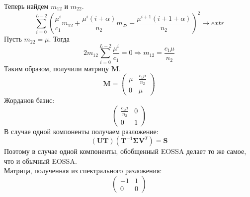 \documentclass[specialist, substylefile = spbureport.rtx, subf,href,colorlinks=true, 12pt]{disser}
\theoremstyle{definition}
\begin{document}
    Теперь найдем $m_{12}$ и $m_{22}$.
    \begin{equation*}
        \sum_{i = 0}^{L - 2}(\frac{\mu^i}{c_1}m_{12} + \frac{\mu^i(i + \alpha)}{n_2}m_{22} - \frac{\mu^{i + 1}(i + 1 + \alpha)}{n_2})^2 \longrightarrow extr
    \end{equation*}
    Пусть $m_{22} = \mu$. Тогда
    \begin{equation*}
         2m_{12}\sum_{i = 0}^{L - 2}\frac{\mu^i}{c_1} = 0 \Rightarrow m_{12} = \frac{c_1 \mu}{n_2}
    \end{equation*}
    Таким образом, получили матрицу $\mathbf{M}$.
    \begin{equation*}
        \mathbf{M} = 
        \begin{pmatrix}
            \mu & \frac{c_1 \mu}{n_2} \\
            0 & \mu
        \end{pmatrix}
    \end{equation*}
    Жорданов базис:
    \begin{equation*}
        \begin{pmatrix}
            \frac{c_1 \mu}{n_2} & 0 \\
            0 & 1
        \end{pmatrix}
    \end{equation*}
    В случае одной компоненты получаем разложение:
    \begin{equation*}
        (\mathbf{UT})(\mathbf{T}^{-1}\mathbf{\Sigma V}^T) = \mathbf{S}
    \end{equation*}
    Поэтому в случае одной компоненты, обобщенный EOSSA делает то же самое, что и обычный EOSSA. \\
    Матрица, полученная из спектрального разложения:
    \begin{equation*}
        \begin{pmatrix}
            -1 & 1 \\
            0 & 0
        \end{pmatrix}
    \end{equation*}
\end{document}
